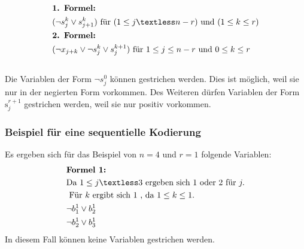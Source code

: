 \documentclass[a4,abstract=on]{scrartcl}
\begin{document}
\begin{align*}
&\textbf{1. Formel:}\\
&(\neg s_j^k \vee s_{j+1}^k) \text{ für } (1 \leq j \textless n - r) \text{ und } (1 \leq k \leq r)\\
&\textbf{2. Formel:}\\
&(\neg x_{j+k} \vee \neg s_j^k \vee s_j^{k+1}) \text{ für } 1 \leq j \leq n - r \text{ und } 0 \leq k \leq r\\
\end{align*}
\ \\
Die Variablen der Form  $\neg s_j^0$ können gestrichen werden. Dies ist möglich, weil sie nur in der negierten Form vorkommen. Des Weiteren dürfen Variablen der Form $\text{s}_j^{r+1}$ gestrichen werden, weil sie nur positiv vorkommen.

	\subsubsection*{Beispiel für eine sequentielle Kodierung}
Es ergeben sich für das Beispiel von $n=4$ und $r=1$ folgende Variablen:\\

\begin{align*}
&\textbf{Formel 1:}\\
& \text{Da } 1 \leq j \textless 3 \text{ ergeben sich } 1 \text{ oder } 2 \text{ für } j.\\
&\text{ Für } k \text{ ergibt sich } 1 \text{ , da } 1 \leq k \leq 1.\\
&\neg b_1^1 \vee b_2^1\\
&\neg b_2^1 \vee b_3^1\\
\end{align*}
In diesem Fall können keine Variablen gestrichen werden.\\
\end{document}
